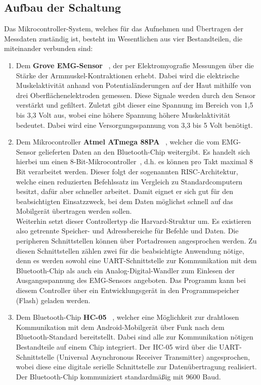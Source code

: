 \subsection{Aufbau der Schaltung}
Das Mikrocontroller-System, welches für das Aufnehmen und Übertragen der Messdaten zuständig ist, besteht im Wesentlichen aus vier Bestandteilen, die miteinander verbunden sind:
\begin{enumerate}
\item Dem \textbf{Grove EMG-Sensor} \cite{Src:EMGdetect}~, der per Elektromyografie Messungen über die Stärke der Armmuskel-Kontraktionen erhebt. Dabei wird die elektrische Muskelaktivität anhand von Potentialänderungen auf der Haut mithilfe von drei Oberflächenelektroden gemessen. Diese Signale werden durch den Sensor verstärkt und gefiltert. Zuletzt gibt dieser eine Spannung im Bereich von 1,5 bis 3,3 Volt aus, wobei eine höhere Spannung höhere Muskelaktivität bedeutet. Dabei wird eine Versorgungsspannung von 3,3 bis 5 Volt benötigt.
\item Dem Mikrocontroller \textbf{Atmel ATmega 88PA} \cite{Src:AtmelDBeins}~, welcher die vom EMG-Sensor gelieferten Daten an den Bluetooth-Chip weitergibt. Es handelt sich hierbei um einen 8-Bit-Mikrocontroller\cite{Src:AtmelDBzwei}~, d.h. es können pro Takt maximal 8 Bit verarbeitet werden. Dieser folgt der sogenannten RISC-Architektur, welche einen reduzierten Befehlssatz im Vergleich zu Standardcomputern besitzt, dafür aber schneller arbeitet. Damit eignet er sich gut für den beabsichtigten Einsatzzweck, bei dem Daten möglichst schnell auf das Mobilgerät übertragen werden sollen. \\
Weiterhin setzt dieser Controllertyp die Harvard-Struktur um. \cite{Src:SchmittAVR} Es existieren also getrennte Speicher- und Adressbereiche für Befehle und Daten. Die peripheren Schnittstellen können über Portadressen angesprochen werden. Zu diesen Schnittstellen zählen zwei für die beabsichtigte Anwendung nötige, denn es werden sowohl eine UART-Schnittstelle zur Kommunikation mit dem Bluetooth-Chip als auch ein Analog-Digital-Wandler zum Einlesen der Ausgangsspannung des EMG-Sensors angeboten. Das Programm kann bei diesem Controller über ein Entwicklungsgerät in den Programmspeicher (Flash) geladen werden.
\item Dem Bluetooth-Chip \textbf{HC-05} \cite{Src:BluetoothHC}~, welcher eine Möglichkeit zur drahtlosen Kommunikation mit dem Android-Mobilgerät über Funk nach dem Bluetooth-Standard bereitstellt. Dabei sind alle zur Kommunikation nötigen Bestandteile auf einem Chip integriert. Der HC-05 wird über die UART-Schnittstelle (Universal Asynchronous Receiver Transmitter) angesprochen, wobei diese eine digitale serielle Schnittstelle zur Datenübertragung realisiert. Der Bluetooth-Chip kommuniziert standardmäßig mit 9600 Baud.

\end{enumerate}
